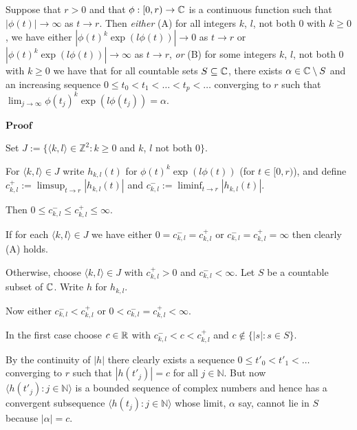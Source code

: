 \documentclass[12pt,nodate]{article}
\begin{document}
 Suppose that $r > 0$ and that $\phi : [0, r) \rightarrow \mathbb{C}$ is a continuous function such that $|\phi (t)| \rightarrow \infty$ as $t \rightarrow r$. Then \emph{either} (A) for all integers $k$, $l$, not both $0$ with $k \geq 0$, we have either $|\phi (t)^k \exp(l\phi (t))| \rightarrow 0$ as $t \rightarrow r$ or $|\phi (t)^k \exp(l\phi (t))| \rightarrow \infty$ as $t \rightarrow r$,  \emph{or} (B) for some integers 
$k$, $l$, not both $0$ with $k \geq 0$ we have that for all countable sets $S \subseteq \mathbb{C}$, there exists $\alpha \in \mathbb{C} \setminus S$ and an increasing sequence $0 \leq t_0 < t_1 < \ldots < t_p < \ldots$ converging to $r$ such that $\lim_{j \rightarrow \infty} \phi (t_j)^k \exp(l\phi (t_j)) = \alpha$.
 
\vspace{1mm}

\noindent
$\mathbf{Proof}$

\vspace{1mm}

Set $J := \{ \langle k, l \rangle \in \mathbb{Z}^2 : k \geq 0$ and $k$, $l$ not both $0 \}$.

For $\langle k, l \rangle \in J$ write $h_{k, l} (t)$ for  $\phi (t)^k \exp(l\phi (t))$ (for $t \in [0, r)$), and define $c_{k, l}^{+} := \limsup_{t \rightarrow r}  |h_{k, l} (t)|$  and $c_{k, l}^{-} := \liminf_{t \rightarrow r}  |h_{k, l} (t)|$.  

Then $0 \leq  c_{k, l}^{-} \leq c_{k, l}^{+} \leq \infty$.

If for each $\langle k, l \rangle \in J$ we have either $0 = c_{k, l}^{-} = c_{k, l}^{+}$ or $c_{k, l}^{-} = c_{k, l}^{+} = \infty$ then clearly (A) holds.

Otherwise, choose $\langle k, l \rangle \in J$ with $c_{k, l}^{+} >0$ and $c_{k, l}^{-} < \infty$. Let $S$ be a countable subset of $\mathbb{C}$. Write $h$ for $h_{k, l}$.

\vspace{1mm}

Now either $c_{k, l}^{-} < c_{k, l}^{+}$ or $0 < c_{k, l}^{-} = c_{k, l}^{+} < \infty$.



In the first case choose $c \in \mathbb{R}$ with $c_{k, l}^{-} < c < c_{k, l}^{+}$ and $c \notin \{ |s| : s \in S \}$.

 By the continuity of $|h|$ there clearly exists a sequence $0 \leq t'_0 < t'_1 < \ldots$ converging to $r$ such that $|h(t'_j)| = c$ for all $j \in \mathbb{N}$. But now \\ $\langle h(t'_j ) : j \in \mathbb{N} \rangle$ is a bounded sequence of complex numbers and hence has a convergent subsequence $\langle h(t_j ) : j \in \mathbb{N} \rangle$ whose limit, $\alpha$ say, cannot lie in $S$ because $|\alpha | = c$.
\end{document}

